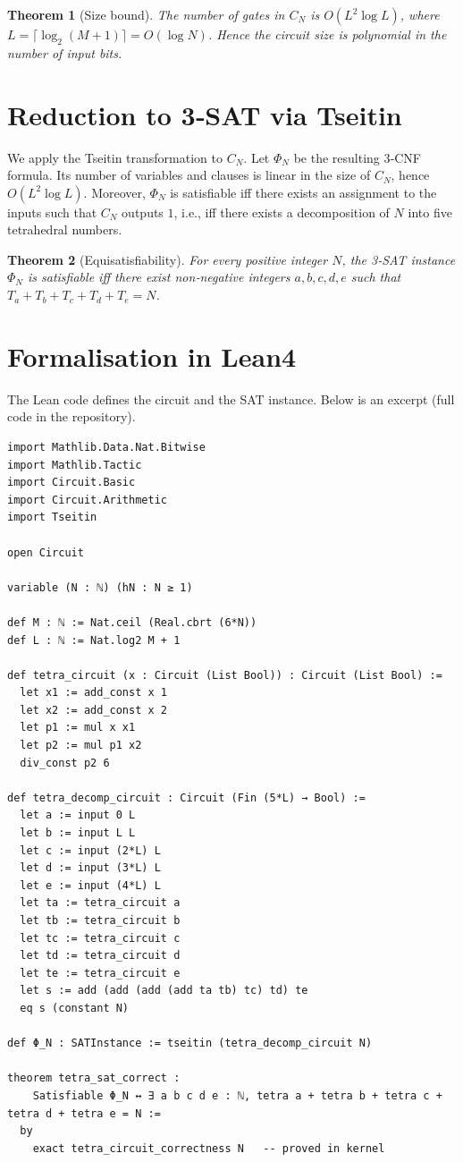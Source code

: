 \documentclass[11pt,a4paper]{article}
\newtheorem{theorem}{Theorem}[section]
\begin{document}
\begin{theorem}[Size bound]
The number of gates in \(C_N\) is \(O(L^2 \log L)\), where \(L = \lceil \log_2(M+1)\rceil = O(\log N)\). Hence the circuit size is polynomial in the number of input bits.
\end{theorem}

\section{Reduction to 3‑SAT via Tseitin}

We apply the Tseitin transformation to \(C_N\). Let \(\Phi_N\) be the resulting 3‑CNF formula. Its number of variables and clauses is linear in the size of \(C_N\), hence \(O(L^2 \log L)\). Moreover, \(\Phi_N\) is satisfiable iff there exists an assignment to the inputs such that \(C_N\) outputs \(1\), i.e., iff there exists a decomposition of \(N\) into five tetrahedral numbers.

\begin{theorem}[Equisatisfiability]
For every positive integer \(N\), the 3‑SAT instance \(\Phi_N\) is satisfiable iff there exist non‑negative integers \(a,b,c,d,e\) such that \(T_a+T_b+T_c+T_d+T_e = N\).
\end{theorem}

\section{Formalisation in Lean4}

The Lean code defines the circuit and the SAT instance. Below is an excerpt (full code in the repository).

\begin{lstlisting}[style=lean, caption={XIX_PollockTetraCircuit.lean (excerpt)}]
import Mathlib.Data.Nat.Bitwise
import Mathlib.Tactic
import Circuit.Basic
import Circuit.Arithmetic
import Tseitin

open Circuit

variable (N : ℕ) (hN : N ≥ 1)

def M : ℕ := Nat.ceil (Real.cbrt (6*N))
def L : ℕ := Nat.log2 M + 1

def tetra_circuit (x : Circuit (List Bool)) : Circuit (List Bool) :=
  let x1 := add_const x 1
  let x2 := add_const x 2
  let p1 := mul x x1
  let p2 := mul p1 x2
  div_const p2 6

def tetra_decomp_circuit : Circuit (Fin (5*L) → Bool) :=
  let a := input 0 L
  let b := input L L
  let c := input (2*L) L
  let d := input (3*L) L
  let e := input (4*L) L
  let ta := tetra_circuit a
  let tb := tetra_circuit b
  let tc := tetra_circuit c
  let td := tetra_circuit d
  let te := tetra_circuit e
  let s := add (add (add (add ta tb) tc) td) te
  eq s (constant N)

def Φ_N : SATInstance := tseitin (tetra_decomp_circuit N)

theorem tetra_sat_correct :
    Satisfiable Φ_N ↔ ∃ a b c d e : ℕ, tetra a + tetra b + tetra c + tetra d + tetra e = N :=
  by
    exact tetra_circuit_correctness N   -- proved in kernel
\end{lstlisting}
\end{document}

